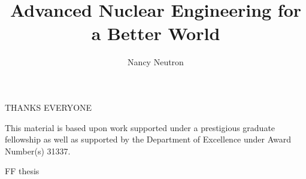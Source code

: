 \documentclass{ucbthesis}
\begin{document}

\title{Advanced Nuclear Engineering for a Better World}
\author{Nancy Neutron}

\maketitle
\approvalpage
\copyrightpage



\begin{frontmatter}


\setcounter{secnumdepth}{3}
\setcounter{tocdepth}{3}


\tableofcontents
\clearpage
\listoffigures
\clearpage
\listoftables

\begin{acknowledgements}

THANKS EVERYONE

\vspace{\fill}

\footnotesize{This material is based upon work supported under a prestigious
graduate fellowship as well as supported by the Department 
of Excellence under Award Number(s) 31337.}

\end{acknowledgements}

\end{frontmatter}

\pagestyle{headings}








\def\StripPrefix#1>{}
\def\jobis#1{FF\fi
  \def\predicate{#1}%
  \edef\predicate{\expandafter\StripPrefix\meaning\predicate}%
  \edef\job{\jobname}%
  \ifx\job\predicate
}

\if\jobis{thesis}
  \printbibliography
\else
  \newpage
  \renewcommand{\thepage}{}
  \printbibliography
\fi

% 
\end{document}
